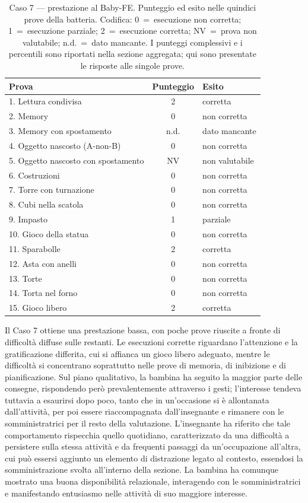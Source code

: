 \begin{table}[htbp]
\centering
\caption[Caso 7 --- prestazione al Baby-FE]{Caso 7 --- prestazione al Baby-FE. Punteggio ed esito nelle quindici prove della batteria. Codifica: 0~=~esecuzione non corretta; 1~=~esecuzione parziale; 2~=~esecuzione corretta; NV~=~prova non valutabile; n.d.~=~dato mancante. I punteggi complessivi e i percentili sono riportati nella sezione aggregata; qui sono presentate le risposte alle singole prove.}
\label{tab:caso7_prove}
\begin{tabular}{|l|c|l|}
\toprule
\textbf{Prova} & \textbf{Punteggio} & \textbf{Esito} \\
\midrule
1. Lettura condivisa & 2 & corretta \\
2. Memory & 0 & non corretta \\
3. Memory con spostamento & n.d. & dato mancante \\
4. Oggetto nascosto (A-non-B) & 0 & non corretta \\
5. Oggetto nascosto con spostamento & NV & non valutabile \\
6. Costruzioni & 0 & non corretta \\
7. Torre con turnazione & 0 & non corretta \\
8. Cubi nella scatola & 0 & non corretta \\
9. Impasto & 1 & parziale \\
10. Gioco della statua & 0 & non corretta \\
11. Sparabolle & 2 & corretta \\
12. Asta con anelli & 0 & non corretta \\
13. Torte & 0 & non corretta \\
14. Torta nel forno & 0 & non corretta \\
15. Gioco libero & 2 & corretta \\
\bottomrule
\end{tabular}
\end{table}

Il Caso 7 ottiene una prestazione bassa, con poche prove riuscite a fronte di difficoltà diffuse sulle restanti. Le esecuzioni corrette riguardano l'attenzione e la gratificazione differita, cui si affianca un gioco libero adeguato, mentre le difficoltà si concentrano soprattutto nelle prove di memoria, di inibizione e di pianificazione. Sul piano qualitativo, la bambina ha seguito la maggior parte delle consegne, rispondendo però prevalentemente attraverso i gesti; l'interesse tendeva tuttavia a esaurirsi dopo poco, tanto che in un'occasione si è allontanata dall'attività, per poi essere riaccompagnata dall'insegnante e rimanere con le somministratrici per il resto della valutazione. L'insegnante ha riferito che tale comportamento rispecchia quello quotidiano, caratterizzato da una difficoltà a persistere sulla stessa attività e da frequenti passaggi da un'occupazione all'altra, cui può essersi aggiunto un elemento di distrazione legato al contesto, essendosi la somministrazione svolta all'interno della sezione. La bambina ha comunque mostrato una buona disponibilità relazionale, interagendo con le somministratrici e manifestando entusiasmo nelle attività di suo maggiore interesse.

